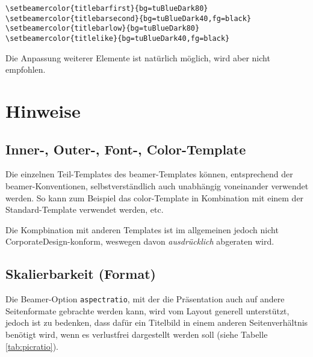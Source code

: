 \example

\begin{lstlisting}
\setbeamercolor{titlebarfirst}{bg=tuBlueDark80}
\setbeamercolor{titlebarsecond}{bg=tuBlueDark40,fg=black}
\setbeamercolor{titlebarlow}{bg=tuBlueDark80}
\setbeamercolor{titlelike}{bg=tuBlueDark40,fg=black}
\end{lstlisting}

Die Anpassung weiterer Elemente ist natürlich möglich,
wird aber nicht empfohlen.

% 
% 

\section{Hinweise}

\subsection{Inner-, Outer-, Font-, Color-Template}

Die einzelnen Teil-Templates des beamer-Templates können,
entsprechend der beamer-Konventionen, selbstverständlich
auch unabhängig voneinander verwendet werden.
So kann zum Beispiel das color-Template in Kombination mit einem der
Standard-Template verwendet werden, etc.

Die Kompbination mit anderen Templates ist im allgemeinen jedoch nicht
CorporateDesign-konform, weswegen davon \emph{ausdrücklich} abgeraten wird.

\subsection{Skalierbarkeit (Format)}

Die Beamer-Option \lstinline{aspectratio}, mit der die Präsentation auch auf
andere Seitenformate gebrachte werden kann, wird vom Layout generell
unterstützt, jedoch ist zu bedenken, dass dafür ein Titelbild in einem anderen
Seitenverhältnis benötigt wird, wenn es verlustfrei dargestellt werden soll
(siehe Tabelle \ref{tab:picratio}).

